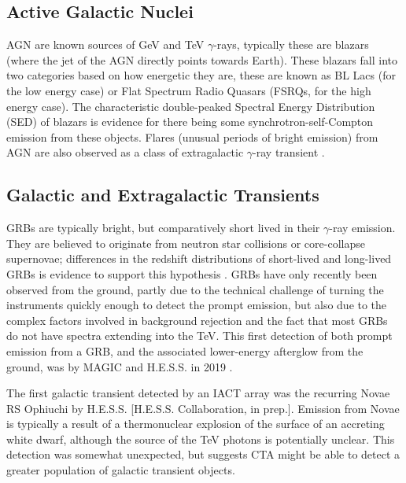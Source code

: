 \subsection{Active Galactic Nuclei}
AGN are known sources of GeV and TeV $\gamma$-rays, typically these are blazars (where the jet of the AGN directly points towards Earth). These blazars fall into two categories based on how energetic they are, these are known as BL Lacs (for the low energy case) or Flat Spectrum Radio Quasars (FSRQs, for the high energy case). The characteristic double-peaked Spectral Energy Distribution (SED) of blazars is evidence for there being some synchrotron-self-Compton emission from these objects. Flares (unusual periods of bright emission) from AGN are also observed as a class of extragalactic $\gamma$-ray transient \cite[see for example][]{TXS}.

\subsection{Galactic and Extragalactic Transients}
GRBs are typically bright, but comparatively short lived in their $\gamma$-ray emission. They are believed to originate from neutron star collisions or core-collapse supernovae; differences in the redshift distributions of short-lived and long-lived GRBs is evidence to support this hypothesis \cite{longair}. GRBs have only recently been observed from the ground, partly due to the technical challenge of turning the instruments quickly enough to detect the prompt emission, but also due to the complex factors involved in background rejection and the fact that most GRBs do not have spectra extending into the TeV. This first detection of both prompt emission from a GRB, and the associated lower-energy afterglow from the ground, was by MAGIC and H.E.S.S. in 2019 \cite{magicGRB}.

The first galactic transient detected by an IACT array was the recurring Novae RS Ophiuchi by H.E.S.S. [H.E.S.S. Collaboration, in prep.]. Emission from Novae is typically a result of a thermonuclear explosion of the surface of an accreting white dwarf, although the source of the TeV photons is potentially unclear. This detection was somewhat unexpected, but suggests CTA might be able to detect a greater population of galactic transient objects.

